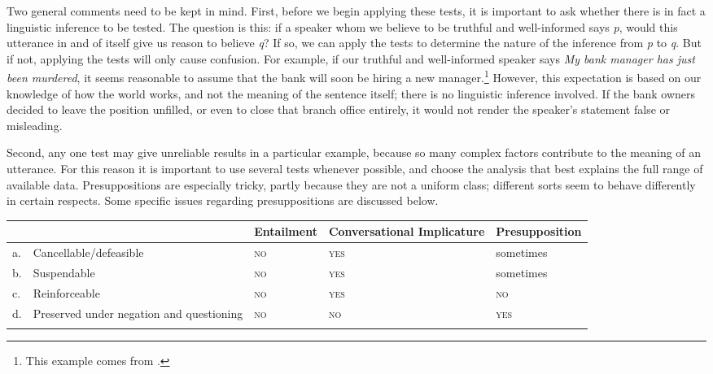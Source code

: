 Two general comments need to be kept in mind. First, before we begin applying these tests, it is important to ask whether there is in fact a linguistic inference to be tested. The question is this: if a speaker whom we believe to be truthful and well-informed says \textit{p}, would this utterance in and of itself give us reason to believe \textit{q}? If so, we can apply the tests to determine the nature of the inference from \textit{p} to \textit{q}. But if not, applying the tests will only cause confusion. For example, if our truthful and well-informed speaker says \textit{My bank manager has just been murdered}, it seems reasonable to assume that the bank will soon be hiring a new manager.\footnote{This example comes from \citet[54]{Saeed2009}.} However, this expectation is based on our knowledge of how the world works, and not the meaning of the sentence itself; there is no linguistic inference involved. If the bank owners decided to leave the position unfilled, or even to close that branch office entirely, it would not render the speaker’s statement false or misleading.



Second, any one test may give unreliable results in a particular example, because so many complex factors contribute to the meaning of an utterance. For this reason it is important to use several tests whenever possible, and choose the analysis that best explains the full range of available data. Presuppositions are especially tricky, partly because they are not a uniform class; different sorts seem to behave differently in certain respects. Some specific issues regarding presuppositions are discussed below.


\ea\label{ex:8.22}
\begin{tabularx}{\textwidth}{lXXXX}
\lsptoprule
&  & Entailment & Conversational Implicature & Presupposition\\\midrule
a. & Cancellable\slash defeasible & \scshape no & \scshape yes & sometimes\footnotemark{}\\
b. & Suspendable & \scshape no & \scshape yes & sometimes\\
c. & Reinforceable & \scshape no & \scshape yes & \scshape no\\
d. & Preserved under negation and questioning & \scshape no & \scshape no & \scshape yes\\
\lspbottomrule
\end{tabularx}
\z
{}

